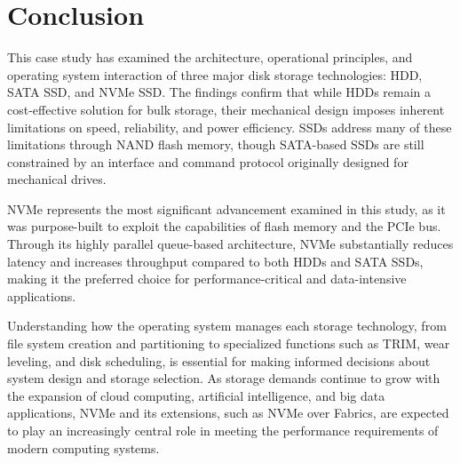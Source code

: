 \section{Conclusion}
This case study has examined the architecture, operational principles, and 
operating system interaction of three major disk storage technologies: HDD, 
SATA SSD, and NVMe SSD. The findings confirm that while HDDs remain a cost-effective 
solution for bulk storage, their mechanical design imposes inherent limitations on 
speed, reliability, and power efficiency. SSDs address many of these limitations 
through NAND flash memory, though SATA-based SSDs are still constrained by an 
interface and command protocol originally designed for mechanical drives.

NVMe represents the most significant advancement examined in this study, as it 
was purpose-built to exploit the capabilities of flash memory and the PCIe bus. 
Through its highly parallel queue-based architecture, NVMe substantially reduces 
latency and increases throughput compared to both HDDs and SATA SSDs, making it 
the preferred choice for performance-critical and data-intensive applications.

Understanding how the operating system manages each storage technology, from file 
system creation and partitioning to specialized functions such as TRIM, wear leveling, 
and disk scheduling, is essential for making informed decisions about system design and 
storage selection. As storage demands continue to grow with the expansion of cloud computing, 
artificial intelligence, and big data applications, NVMe and its extensions, such as NVMe over 
Fabrics, are expected to play an increasingly central role in meeting the performance 
requirements of modern computing systems.